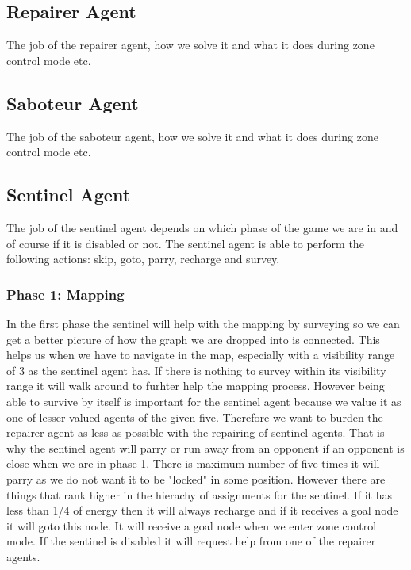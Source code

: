\documentclass[11pt]{article}
\begin{document}
\subsection{Repairer Agent}
The job of the repairer agent, how we solve it and what it does during zone control mode etc.

\subsection{Saboteur Agent}
The job of the saboteur agent, how we solve it and what it does during zone control mode etc.

\subsection{Sentinel Agent}
The job of the sentinel agent depends on which phase of the game we are in and of course if it is disabled or not. The sentinel agent is able to perform the following actions: skip, goto, parry, recharge and survey.
\subsubsection{Phase 1: Mapping}
In the first phase the sentinel will help with the mapping by surveying so we can get a better picture of how the graph we are dropped into is connected. This helps us when we have to navigate in the map, especially with a visibility range of 3 as the sentinel agent has. If there is nothing to survey within its visibility range it will walk around to furhter help the mapping process. However being able to survive by itself is important for the sentinel agent because we value it as one of lesser valued agents of the given five. Therefore we want to burden the repairer agent as less as possible with the repairing of sentinel agents. That is why the sentinel agent will parry or run away from an opponent if an opponent is close when we are in phase 1. There is maximum number of five times it will parry as we do not want it to be "locked" in some position. However there are things that rank higher in the hierachy of assignments for the sentinel. If it has less than 1/4 of energy then it will always recharge and if it receives a goal node it will goto this node. It will receive a goal node when we enter zone control mode. If the sentinel is disabled it will request help from one of the repairer agents.
 
\end{document}
